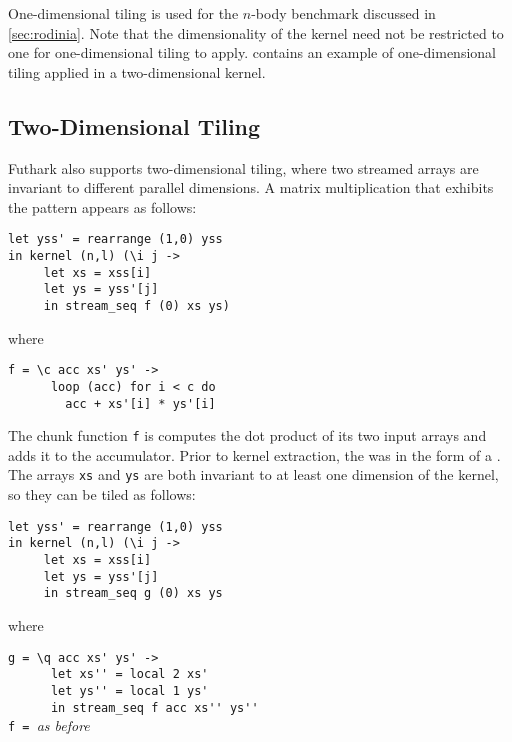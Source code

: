 One-dimensional tiling is used for the $n$-body benchmark discussed in
\cref{sec:rodinia}.  Note that the dimensionality of the kernel need
not be restricted to one for one-dimensional tiling to apply.
 contains an example of one-dimensional tiling
applied in a two-dimensional kernel.

\subsection{Two-Dimensional Tiling}
\label{sec:two-dimensional-tiling}

Futhark also supports two-dimensional tiling, where two streamed
arrays are invariant to different parallel dimensions.  A matrix
multiplication that exhibits the pattern appears as follows:

\begin{lstlisting}[xleftmargin=0.5cm]
let yss' = rearrange (1,0) yss
in kernel (n,l) (\i j ->
     let xs = xss[i]
     let ys = yss'[j]
     in stream_seq f (0) xs ys)
\end{lstlisting}
\begin{minipage}[t]{0.1\linewidth}
  \begin{flushright}
    where
  \end{flushright}
\end{minipage}
\begin{minipage}[t]{0.8\linewidth}
\lstinline{f = \c acc xs' ys' ->}\\
\lstinline{      loop (acc) for i < c do}\\
\lstinline{        acc + xs'[i] * ys'[i]}
\end{minipage}
\vspace{1em}

The chunk function \lstinline{f} is computes the dot product of its
two input arrays and adds it to the accumulator.  Prior to kernel
extraction, the \StreamSeq{} was in the form of a .  The
arrays \lstinline{xs} and \lstinline{ys} are both invariant to at
least one dimension of the kernel, so they can be tiled as follows:

\begin{lstlisting}[xleftmargin=0.5cm]
let yss' = rearrange (1,0) yss
in kernel (n,l) (\i j ->
     let xs = xss[i]
     let ys = yss'[j]
     in stream_seq g (0) xs ys
\end{lstlisting}
\begin{minipage}[t]{0.1\linewidth}
  \begin{flushright}
    where
  \end{flushright}
\end{minipage}
\begin{minipage}[t]{0.8\linewidth}
\lstinline{g = \q acc xs' ys' ->}\\
\lstinline{      let xs'' = local 2 xs'}\\
\lstinline{      let ys'' = local 1 ys'}\\
\lstinline{      in stream_seq f acc xs'' ys''}\\
\lstinline{f = }\textit{as before}
\end{minipage}
\vspace{1em}

